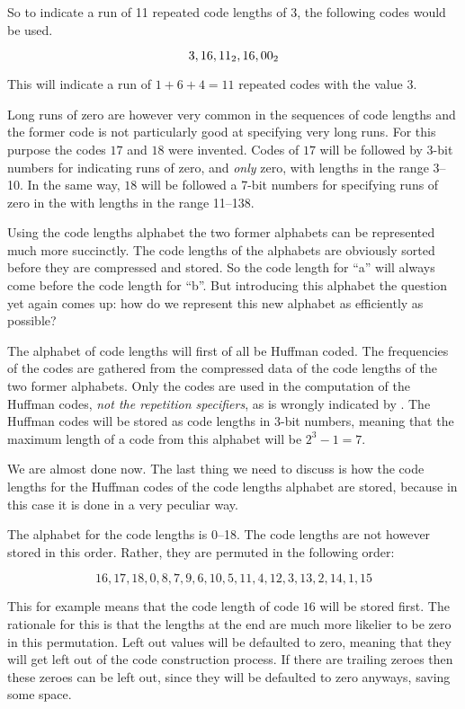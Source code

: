 So to indicate a run of 11 repeated code lengths of $3$, the following
codes would be used.

\begin{equation*}
  3, 16, \mbox{\ensuremath{11_2}}, 16, \mbox{\ensuremath{00_2}}
\end{equation*}

This will indicate a run of $1 + 6 + 4 = 11$ repeated codes with the
value $3$.

Long runs of zero are however very common in the sequences of code
lengths and the former code is not particularly good at specifying
very long runs. For this purpose the codes $17$ and $18$ were
invented. Codes of $17$ will be followed by 3-bit numbers for
indicating runs of zero, and \textit{only} zero, with lengths in the
range 3--10. In the same way, $18$ will be followed a 7-bit numbers
for specifying runs of zero in the with lengths in the range 11--138.

Using the code lengths alphabet the two former alphabets can be
represented much more succinctly. The code lengths of the alphabets
are obviously sorted before they are compressed and stored. So the
code length for ``a'' will always come before the code length for
``b''. But introducing this alphabet the question yet again comes up:
how do we represent this new alphabet as efficiently as possible?

The alphabet of code lengths will first of all be Huffman coded. The
frequencies of the codes are gathered from the compressed data of the
code lengths of the two former alphabets. Only the codes are used in
the computation of the Huffman codes, \textit{not the repetition
  specifiers}, as is wrongly indicated by \cite{Salomon:2004:DCC}. The
Huffman codes will be stored as code lengths in 3-bit numbers, meaning
that the maximum length of a code from this alphabet will be $2^3 - 1
= 7$.

We are almost done now. The last thing we need to discuss is how the
code lengths for the Huffman codes of the code lengths alphabet are
stored, because in this case it is done in a very peculiar way.

The alphabet for the code lengths is 0--18. The code lengths are not
however stored in this order. Rather, they are permuted in the
following order:

\begin{equation*}
  16, 17, 18, 0, 8, 7, 9, 6, 10, 5, 11, 4, 12, 3, 13, 2, 14, 1, 15
\end{equation*}

This for example means that the code length of code $16$ will be
stored first. The rationale for this is that the lengths at the end
are much more likelier to be zero in this permutation. Left out values
will be defaulted to zero, meaning that they will get left out of the
code construction process. If there are trailing zeroes then these
zeroes can be left out, since they will be defaulted to zero anyways,
saving some space.

